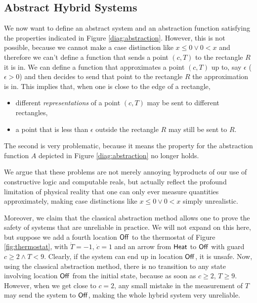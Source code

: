 \documentclass[runningheads]{llncs}
\newcommand{\DN}{{\sf DN}\,}
\newcommand{\Heat}{{\sf Heat}}
\newcommand{\Off}{{\sf Off}}
\newcommand{\State}{{\rm State}}
\newcommand{\Unsafe}{{\rm Unsafe}}
\newcommand{\Reach}{{\rm Reach}}
\begin{document}

\subsection{Abstract Hybrid Systems}
\label{abshybsys}
\label{abstraction}
We now want to define an abstract system and an abstraction function
satisfying the properties indicated in Figure
\ref{diag:abstraction}. However, this is not possible, because we
cannot make a case distinction like $x\leq 0 \vee 0< x$ and therefore
we can't define a function that sends a point $(c,T)$ to the rectangle $R$
it is in. We can define a function that approximates a point $(c,T)$
up to, say $\epsilon$ ($\epsilon >0$) and then decides to send that
point to the rectangle $R$ the approximation is in. This implies that,
when one is close to the edge of a rectangle,
\begin{itemize}
\item 
different {\em representations\/} of a point $(c,T)$ may be
sent to different rectangles,
\item
a point that is less than $\epsilon$ outside the rectangle $R$ may still be sent to $R$.
\end{itemize}
The second is very problematic, because it means the property for the
abstraction function $A$ depicted in Figure
\ref{diag:abstraction} no longer holds.

We argue that these problems are not merely annoying byproducts
of our use of constructive logic and computable reals, but actually
reflect the profound limitation of physical reality that one can only
ever measure quantities approximately, making case distinctions like
$x\leq 0 \vee 0< x$ simply unrealistic.

Moreover, we claim that the
classical abstraction method allows one to prove the safety of systems
that are unreliable in practice. We will not expand on this here, but
suppose we add a fourth location $\Off$ to the thermostat of Figure
\ref{fig:thermostat}, with $\dot{T} = -1$, $\dot{c} =1$ and an arrow
from $\Heat$ to $\Off$ with guard $c\geq 2 \wedge T<9$. Clearly, if
the system can end up in location $\Off$, it is unsafe. Now, using
the classical abstraction method, there is no transition to any state
involving location $\Off$ from the initial state, because as soon as
$c\geq 2$, $T\geq 9$. However, when we get close to $c=2$, any small
mistake in the measurement of $T$ may send the system to $\Off$,
making the whole hybrid system very unreliable.
\end{document}

